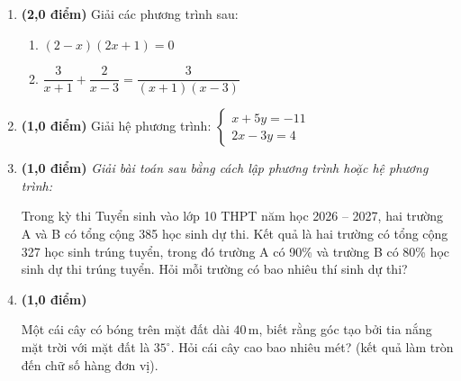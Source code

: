 \documentclass[12pt,a4paper]{article}
\begin{document}
\begin{enumerate}[label=\textbf{Câu \arabic*.}, leftmargin=*, itemsep=4pt, parsep=0pt, start=9]
  \item \textbf{(2,0 điểm)} Giải các phương trình sau:
  \begin{enumerate}[label=\alph*), leftmargin=20pt, itemsep=2pt]
    \item $(2 - x)(2x + 1) = 0$
    \item $\dfrac{3}{x + 1} + \dfrac{2}{x - 3} = \dfrac{3}{(x + 1)(x - 3)}$
  \end{enumerate}

  \item \textbf{(1,0 điểm)} Giải hệ phương trình: $\begin{cases} x + 5y = -11 \\ 2x - 3y = 4 \end{cases}$

  \item \textbf{(1,0 điểm)} \textit{Giải bài toán sau bằng cách lập phương trình hoặc hệ phương trình:}
  
  Trong kỳ thi Tuyển sinh vào lớp 10 THPT năm học 2026 -- 2027, hai trường A và B có tổng cộng 385 học sinh dự thi. Kết quả là hai trường có tổng cộng 327 học sinh trúng tuyển, trong đó trường A có 90\% và trường B có 80\% học sinh dự thi trúng tuyển. Hỏi mỗi trường có bao nhiêu thí sinh dự thi?

  \item \textbf{(1,0 điểm)} 
  \par\noindent
  \begin{minipage}[t]{0.68\linewidth}
    Một cái cây có bóng trên mặt đất dài $40\,\text{m}$, biết rằng góc tạo bởi tia nắng mặt trời với mặt đất là $35^\circ$. Hỏi cái cây cao bao nhiêu mét? (kết quả làm tròn đến chữ số hàng đơn vị).
  \end{minipage}\hfill
  \begin{minipage}[t]{0.30\linewidth}
    \vspace{-2mm}
    \centering
\end{minipage}
\end{enumerate}
\end{document}
